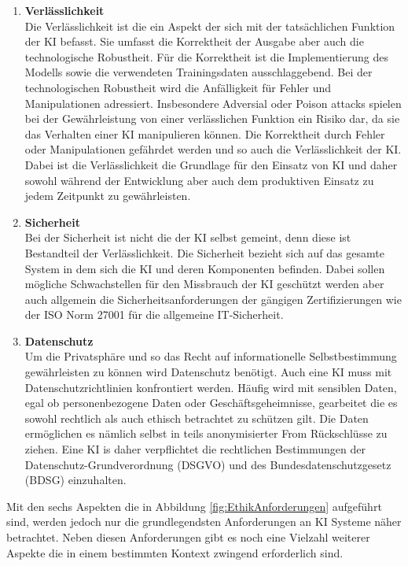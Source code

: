 \begin{onehalfspace}
\begin{enumerate}
            \item \textbf{Verlässlichkeit} \\
            Die Verlässlichkeit ist die ein Aspekt der sich mit der tatsächlichen Funktion der \ac*{KI} befasst. Sie umfasst die Korrektheit der Ausgabe aber auch die technologische Robustheit. Für die Korrektheit ist die Implementierung des Modells sowie die verwendeten Trainingsdaten ausschlaggebend. Bei der technologischen Robustheit wird die Anfälligkeit für Fehler und Manipulationen adressiert. Insbesondere Adversial oder Poison attacks spielen bei der Gewährleistung von einer verlässlichen Funktion ein Risiko dar, da sie das Verhalten einer \ac*{KI} manipulieren können. Die Korrektheit durch Fehler oder Manipulationen gefährdet werden und so auch die Verlässlichkeit der \ac{KI}. Dabei ist die Verlässlichkeit die Grundlage für den Einsatz von \ac*{KI} und daher sowohl während der Entwicklung aber auch dem produktiven Einsatz zu jedem Zeitpunkt zu gewährleisten.\cite{Cremers2019}\cite{Hallensleben2020}
            \item \textbf{Sicherheit} \\
            Bei der Sicherheit ist nicht die der \ac*{KI} selbst gemeint, denn diese ist Bestandteil der Verlässlichkeit. Die Sicherheit bezieht sich auf das gesamte System in dem sich die \ac*{KI} und deren Komponenten befinden. Dabei sollen mögliche Schwachstellen für den Missbrauch der \ac*{KI} geschützt werden aber auch allgemein die Sicherheitsanforderungen der gängigen Zertifizierungen wie der ISO Norm 27001 für die allgemeine IT-Sicherheit.\cite{Cremers2019}\cite{Hagendorff2020}
            \item \textbf{Datenschutz} \\
            Um die Privatsphäre und so das Recht auf informationelle Selbstbestimmung gewährleisten zu können wird Datenschutz benötigt. Auch eine \ac*{KI} muss mit Datenschutzrichtlinien konfrontiert werden. Häufig wird mit sensiblen Daten, egal ob personenbezogene Daten oder Geschäftsgeheimnisse, gearbeitet die es sowohl rechtlich als auch ethisch betrachtet zu schützen gilt. Die Daten ermöglichen es nämlich selbst in teils anonymisierter From Rückschlüsse zu ziehen. Eine \ac*{KI} is daher verpflichtet die rechtlichen Bestimmungen der Datenschutz-Grundverordnung (DSGVO) und des Bundesdatenschutzgesetz (BDSG) einzuhalten.\cite{Cremers2019}
        \end{enumerate}
        Mit den sechs Aspekten die in Abbildung \ref*{fig:EthikAnforderungen} aufgeführt sind, werden jedoch nur die grundlegendsten Anforderungen an \ac*{KI} Systeme näher betrachtet. Neben diesen Anforderungen gibt es noch eine Vielzahl weiterer Aspekte die in einem bestimmten Kontext zwingend erforderlich sind. 

\end{onehalfspace}
